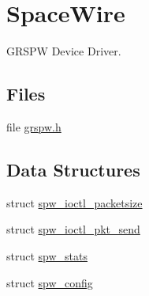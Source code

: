 \hypertarget{group__spw}{}\section{Space\+Wire}
\label{group__spw}


G\+R\+S\+PW Device Driver.  


\subsection*{Files}
\begin{DoxyCompactItemize}
\item 
file \mbox{\hyperlink{grspw_8h}{grspw.\+h}}
\end{DoxyCompactItemize}
\subsection*{Data Structures}
\begin{DoxyCompactItemize}
\item 
struct \mbox{\hyperlink{structspw__ioctl__packetsize}{spw\+\_\+ioctl\+\_\+packetsize}}
\item 
struct \mbox{\hyperlink{structspw__ioctl__pkt__send}{spw\+\_\+ioctl\+\_\+pkt\+\_\+send}}
\item 
struct \mbox{\hyperlink{structspw__stats}{spw\+\_\+stats}}
\item 
struct \mbox{\hyperlink{structspw__config}{spw\+\_\+config}}
\end{DoxyCompactItemize}

